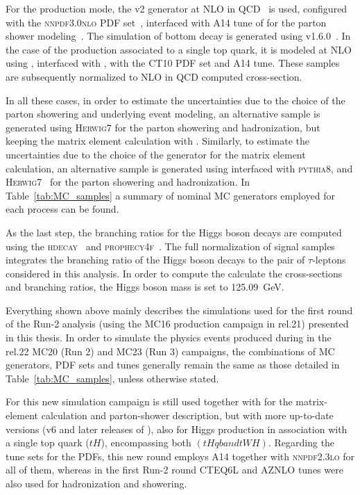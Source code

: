 For the \tth production mode, the \powhegbox v2 generator at NLO in QCD~\cite{frixione2015,Zhang_2014,Dawson_2003,Beenakker_2003} is used, configured with the \textsc{nnpdf3.0nlo} PDF set~\cite{Martin_2009}, interfaced with A14 tune of  for the parton shower modeling~\cite{A14}. The simulation of bottom decay is generated using \evtgen v1.6.0~\cite{LANGE2001152}.
In the case of the production associated to a single top quark, it is modeled at NLO using \madgraph, interfaced with , with the \textsc{CT10} PDF set and A14 tune. These samples are subsequently normalized to NLO in QCD computed cross-section.

In all these cases, in order to estimate the uncertainties due to the choice of the parton showering and underlying event modeling, an alternative sample is generated using \textsc{Herwig7} for the parton showering and hadronization, 
but keeping the matrix element calculation with \powheg. Similarly, to estimate the uncertainties due to the choice of the generator for the matrix element calculation,
an alternative sample is generated using \madgraph interfaced with \textsc{pythia8}, and \textsc{Herwig7}~\cite{bellm2017herwig71releasenote} for the parton showering and hadronization.
In Table~\ref{tab:MC_samples} a summary of nominal MC generators employed for each process can be found.

As the last step, the branching ratios for the Higgs boson decays are computed using the \textsc{hdecay}~\cite{Djouadi:1997yw,Spira:1997dg,Djouadi:2006bz} and \textsc{prophecy4f}~\cite{Bredenstein:2006ha,Bredenstein:2006rh,Bredenstein:2006nk}.
The full normalization of signal samples integrates the branching ratio of the Higgs boson decays to the pair of $\tau$-leptons considered in this analysis. In order to compute the calculate the cross-sections and branching ratios, the Higgs boson mass is set to 125.09~GeV.

Everything shown above mainly describes the simulations used for the first round of the Run-2 analysis (using the MC16 production campaign in rel.21) presented in this thesis. In order to simulate the physics events produced during in the rel.22 MC20 (Run 2) and MC23 (Run 3) campaigns,
the combinations of MC generators, PDF sets and tunes generally remain the same as those detailed in Table~\ref{tab:MC_samples}, unless otherwise stated.

For this new simulation campaign \powheg is still used together with \pythia for the matrix-element calculation and parton-shower description, but with more up-to-date versions (v6 and later releases of ), also for Higgs production in association with a single top quark ($tH$), encompassing both $(tHqb and tWH)$.
Regarding the tune sets for the PDFs, this new round employs A14 together with \textsc{nnpdf2.3lo} for all of them, whereas in the first Run-2 round \textsc{CTEQ6L} and \textsc{AZNLO} tunes were also used for hadronization and showering.

